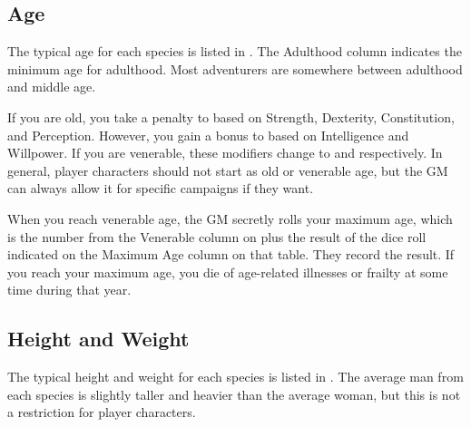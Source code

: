   \subsection{Age}
    The typical age for each species is listed in .
    The Adulthood column indicates the minimum age for adulthood.
    Most adventurers are somewhere between adulthood and middle age.

    If you are old, you take a  penalty to  based on Strength, Dexterity, Constitution, and Perception.
    However, you gain a  bonus to  based on Intelligence and Willpower.
    If you are venerable, these modifiers change to  and  respectively.
    In general, player characters should not start as old or venerable age, but the GM can always allow it for specific campaigns if they want.

    When you reach venerable age, the GM secretly rolls your maximum age, which is the number from the Venerable column on  plus the result of the dice roll indicated on the Maximum Age column on that table.
    They record the result.
    If you reach your maximum age, you die of age-related illnesses or frailty at some time during that year.

  \subsection{Height and Weight}
    The typical height and weight for each species is listed in .
    The average man from each species is slightly taller and heavier than the average woman, but this is not a restriction for player characters.
